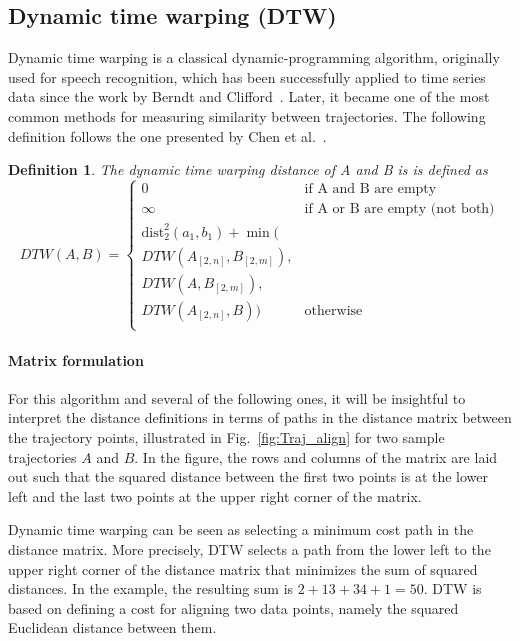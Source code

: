 \documentclass[10pt,letterpaper]{article}
\newcommand{\dist}{\ensuremath{\text{dist}}}
\newtheorem{definition}{Definition}
\begin{document}
\subsection{Dynamic time warping (DTW)}
Dynamic time warping is a classical dynamic-programming algorithm, originally used for speech recognition, which has been successfully applied to time series data since the work by Berndt and Clifford~\cite{BerndtC94}.
Later, it became one of the most common methods for measuring similarity between trajectories.
The following definition follows the one presented by Chen et al.~\cite{ChenOO05}.

\begin{definition}
The dynamic time warping distance of A and B is is defined as
\[
DTW(A,B) =
\left\{
	\begin{array}{ll}
		0  & \mbox{if A and B are empty} \\
		\infty  & \mbox{if A or B are empty (not both)} \\
		\dist_2^2(a_1,b_1) +
		\min( \\
	DTW(A_{[2,n]},B_{[2,m]}), \\
			  DTW(A,B_{[2,m]}),  \\
			DTW(A_{[2,n]},B)) & \mbox{otherwise } \\
		\end{array}
\right.
\]
\end{definition}

\paragraph{Matrix formulation}
For this algorithm and several of the following ones, it will be insightful to interpret the distance definitions in terms of paths in the distance matrix between the trajectory points, illustrated in Fig.~\ref{fig:Traj_align} for two sample trajectories $A$ and $B$.
In the figure, the rows and columns of the matrix are laid out such that the squared distance between the first two points is at the lower left and the last two points at the upper right corner of the matrix.


Dynamic time warping can be seen as selecting a minimum cost path in the distance matrix.
More precisely, DTW selects a path from the lower left to the upper right corner of the distance matrix that minimizes the sum of squared distances. In the example, the resulting sum is $2 + 13 + 34 + 1
 = 50$. DTW is based on defining a cost for aligning two data points, namely the squared Euclidean distance between them.
\end{document}
